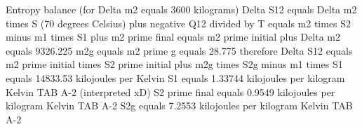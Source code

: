 Entropy balance (for Delta m2 equals 3600 kilograms)  
Delta S12 equals Delta m2 times S (70 degrees Celsius) plus negative Q12 divided by T equals m2 times S2 minus m1 times S1  
plus  
m2 prime final equals m2 prime initial plus Delta m2 equals 9326.225  
m2g equals m2 prime g equals 28.775  
therefore Delta S12 equals m2 prime initial times S2 prime initial plus m2g times S2g minus m1 times S1  
equals 14833.53 kilojoules per Kelvin  
S1 equals 1.33744 kilojoules per kilogram Kelvin  
TAB A-2 (interpreted xD)  
S2 prime final equals 0.9549 kilojoules per kilogram Kelvin  
TAB A-2  
S2g equals 7.2553 kilojoules per kilogram Kelvin  
TAB A-2